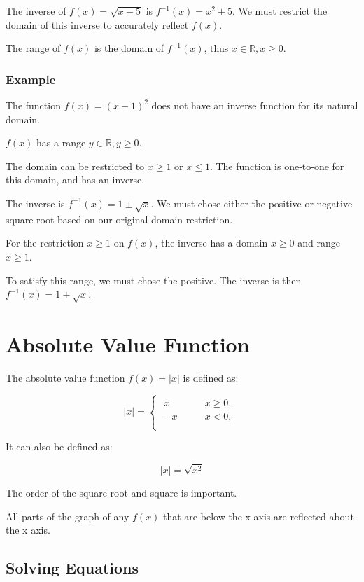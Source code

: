 \documentclass[a4paper,11pt]{article}
\begin{document}
The inverse of $f(x) = \sqrt{x - 5}$ is $f^{-1}(x) = x^2 + 5$. We must restrict
the domain of this inverse to accurately reflect $f(x)$.

The range of $f(x)$ is the domain of $f^{-1}(x)$, thus
$x \in \mathbb{R}, x \geq 0$.


\subsubsection{Example}

The function $f(x) = (x - 1)^2$ does not have an inverse function for its
natural domain.

$f(x)$ has a range $y \in \mathbb{R}, y \geq 0$.

The domain can be restricted to $x \geq 1$ or $x \leq 1$. The function is
one-to-one for this domain, and has an inverse.

The inverse is $f^{-1}(x) = 1 \pm \sqrt{x}$. We must chose either the positive
or negative square root based on our original domain restriction.

For the restriction $x \geq 1$ on $f(x)$, the inverse has a domain $x \geq 0$
and range $x \geq 1$.

To satisfy this range, we must chose the positive. The inverse is then
$f^{-1}(x) = 1 + \sqrt{x}$.




\section{Absolute Value Function}

The absolute value function $f(x) = \lvert x \rvert$ is defined as:

$$
\lvert x \rvert = \begin{cases}
\begin{aligned}
	x \qquad & x \geq 0, \\
	-x \qquad & x < 0, \\
\end{aligned}
\end{cases}
$$

It can also be defined as:

$$
\lvert x \rvert = \sqrt{x^2}
$$

The order of the square root and square is important.

All parts of the graph of any $f(x)$ that are below the x axis are reflected
about the x axis.


\subsection{Solving Equations}
\end{document}
